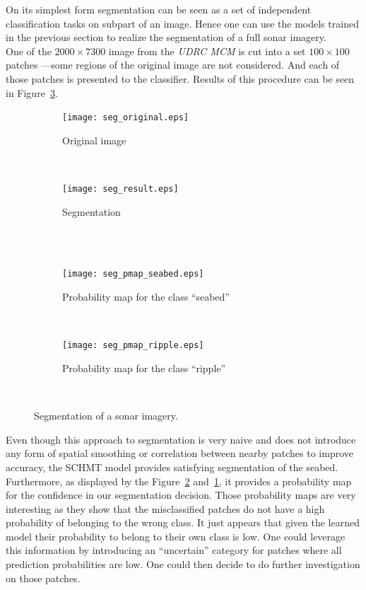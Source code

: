 \documentclass[a4paper,11pt]{report}
\begin{document}
		On its simplest form segmentation can be seen as a set of independent classification tasks on subpart of an image. Hence one can use the models trained in the previous section to realize the segmentation of a full sonar imagery.\\
		
		One of the  $2000 \times 7300$ image from the \textit{UDRC MCM} is cut into a set $100 \times 100$ patches ---some regions of the original image are not considered. And each of those patches is presented to the classifier. Results of this procedure can be seen in Figure~\ref{fig:Segmentation}.\\

		\begin{figure}[h]
			\centering
			\begin{subfigure}[t]{0.48\textwidth}
				\centering
				\texttt{[image: seg\_original.eps]}
				\caption{Original image}
			\end{subfigure}%
			~ 
			\begin{subfigure}[t]{0.48\textwidth}
        \centering
        \texttt{[image: seg\_result.eps]}
        \caption{Segmentation}
			\end{subfigure}
			\\
			~
			\begin{subfigure}[t]{0.48\textwidth}
        \centering
        \texttt{[image: seg\_pmap\_seabed.eps]}
        \caption{Probability map for the class ``seabed''}
        \label{subfig:seg_pmap_seabed}
			\end{subfigure}
			~
			\begin{subfigure}[t]{0.48\textwidth}
        \centering
        \texttt{[image: seg\_pmap\_ripple.eps]}
        \caption{Probability map for the class ``ripple''}
        \label{subfig:seg_pmap_ripple}
			\end{subfigure}
			~
			\caption{Segmentation of a sonar imagery.}
			\label{fig:Segmentation}
		\end{figure}
		
		Even though this approach to segmentation is very naive and does not introduce any form of spatial smoothing or correlation between nearby patches to improve accuracy, the SCHMT model provides satisfying segmentation of the seabed. Furthermore, as displayed by the Figure~\ref{subfig:seg_pmap_ripple} and~\ref{subfig:seg_pmap_seabed}, it provides a probability map for the confidence in our segmentation decision. Those probability maps are very interesting as they show that the misclassified patches do not have a high probability of belonging to the wrong class. It just appears that given the learned model their probability to belong to their own class is low. One could leverage this information by introducing an ``uncertain'' category for patches where all prediction probabilities are low. One could then decide to do further investigation on those patches. %
		
\end{document}
